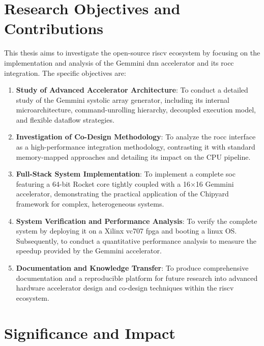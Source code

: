 \section{Research Objectives and Contributions}

This thesis aims to investigate the open-source \acrshort{riscv} ecosystem by focusing on the implementation and analysis of the Gemmini \acrshort{dnn} accelerator and its \acrshort{rocc} integration. The specific objectives are:

\begin{enumerate}
    \item \textbf{Study of Advanced Accelerator Architecture}: To conduct a detailed study of the Gemmini systolic array generator, including its internal microarchitecture, command-unrolling hierarchy, decoupled execution model, and flexible dataflow strategies.
    
    \item \textbf{Investigation of Co-Design Methodology}: To analyze the \acrfull{rocc} interface as a high-performance integration methodology, contrasting it with standard memory-mapped approaches and detailing its impact on the CPU pipeline.
    
    \item \textbf{Full-Stack System Implementation}: To implement a complete \acrshort{soc} featuring a 64-bit Rocket core tightly coupled with a 16×16 Gemmini accelerator, demonstrating the practical application of the Chipyard framework for complex, heterogeneous systems.
    
    \item \textbf{System Verification and Performance Analysis}: To verify the complete system by deploying it on a Xilinx \acrshort{vc707} \acrshort{fpga} and booting a \acrshort{linux} OS. Subsequently, to conduct a quantitative performance analysis to measure the speedup provided by the Gemmini accelerator.
    
    \item \textbf{Documentation and Knowledge Transfer}: To produce comprehensive documentation and a reproducible platform for future research into advanced hardware accelerator design and co-design techniques within the \acrshort{riscv} ecosystem.
\end{enumerate}

\section{Significance and Impact}

